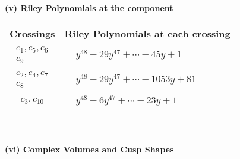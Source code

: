 \documentclass[1p]{elsarticle_modified}
\theoremstyle{definition}
\begin{document}
\newpage\renewcommand{\arraystretch}{1}
\flushleft \textbf{(v) Riley Polynomials at the component}\newline \\
\begin{tabular}{m{50pt}|m{274pt}}
Crossings & \hspace{64pt}Riley Polynomials at each crossing \\
\hline $$\begin{aligned}c_{1},c_{5},c_{6}\\c_{9}\end{aligned}$$&$\begin{aligned}
&y^{48}-29 y^{47}+\cdots-45 y+1
\end{aligned}$\\
\hline $$\begin{aligned}c_{2},c_{4},c_{7}\\c_{8}\end{aligned}$$&$\begin{aligned}
&y^{48}-29 y^{47}+\cdots-1053 y+81
\end{aligned}$\\
\hline $$\begin{aligned}c_{3},c_{10}\end{aligned}$$&$\begin{aligned}
&y^{48}-6 y^{47}+\cdots-23 y+1
\end{aligned}$\\
\hline
\end{tabular}\\~\\
\newpage\flushleft \textbf{(vi) Complex Volumes and Cusp Shapes}
\end{document}
